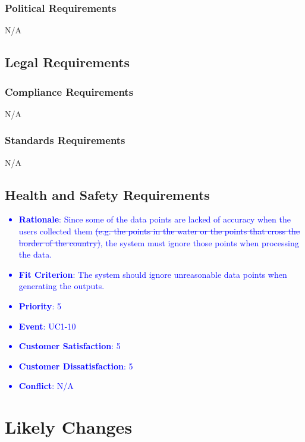 \documentclass[12pt, titlepage]{article}
\newcounter{reqnum} %
\newcounter{freqnum} %
\begin{document}
\begin{itemize}
\subsubsection{Political Requirements}
N/A
\subsection{Legal Requirements}

\subsubsection{Compliance Requirements}
N/A
\subsubsection{Standards Requirements}
N/A
\subsection{Health and Safety Requirements}
\textcolor{blue}{
\item[NFR\refstepcounter{freqnum}\thefreqnum
\label{NFR}:] 
\begin{itemize}
    \item \textbf{Rationale}: Since some of the data points are lacked of accuracy when the users collected them \sout{(e.g. the points in the water or the points that cross the border of the country)}, the system must ignore those points when processing the data.
    \item \textbf{Fit Criterion}: The system should ignore unreasonable data points when generating the outputs.
    \item \textbf{Priority}: 5
    \item \textbf{Event}: UC1-10%
    \item \textbf{Customer Satisfaction}: 5
    \item \textbf{Customer Dissatisfaction}: 5
    \item \textbf{Conflict}: N/A
\end{itemize}
}


\end{itemize}
\section{Likely Changes}
\end{document}
